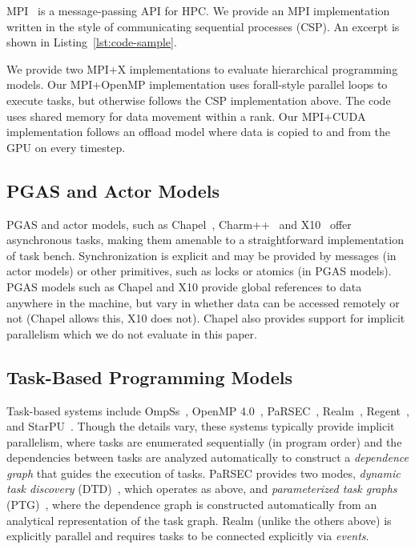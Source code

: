 MPI~\cite{MPI} is a message-passing API for HPC. We provide an MPI
implementation written in the style of communicating sequential
processes (CSP). An excerpt is shown in Listing~\ref{lst:code-sample}.

We provide two MPI+X implementations to evaluate hierarchical
programming models. Our MPI+OpenMP implementation uses forall-style
parallel loops to execute tasks, but otherwise follows the CSP
implementation above. The code uses shared memory for data movement
within a rank. Our MPI+CUDA implementation follows an offload model
where data is copied to and from the GPU on every timestep.

\subsection{PGAS and Actor Models}

PGAS and actor models, such as Chapel~\cite{Chapel15},
Charm++~\cite{Charmpp93} and X10~\cite{X1005} offer
asynchronous tasks, making them amenable to a straightforward
implementation of task bench. Synchronization is explicit and may be
provided by messages (in actor models) or other primitives, such as
locks or atomics (in PGAS models). PGAS models such as Chapel and X10
provide global references to data anywhere in the machine, but vary in
whether data can be accessed remotely or not (Chapel allows this, X10
does not). Chapel also provides support for implicit parallelism which
we do not evaluate in this paper.



\subsection{Task-Based Programming Models}

Task-based systems include OmpSs~\cite{OmpSs11}, OpenMP
4.0~\cite{OpenMPSpec40}, PaRSEC~\cite{PARSEC13, PARSEC_DTD},
Realm~\cite{Realm14}, Regent~\cite{Regent15}, and
StarPU~\cite{StarPU11}. Though the details vary, these systems
typically provide implicit parallelism, where tasks are enumerated
sequentially (in program order) and the dependencies between tasks are
analyzed automatically to construct a \emph{dependence graph} that
guides the execution of tasks. PaRSEC provides two modes,
\emph{dynamic task discovery} (DTD)~\cite{PARSEC_DTD}, which operates
as above, and \emph{parameterized task graphs} (PTG)~\cite{PARSEC13},
where the dependence graph is constructed automatically from an
analytical representation of the task graph. Realm (unlike the others
above) is explicitly parallel and requires tasks to be connected
explicitly via \emph{events}.

